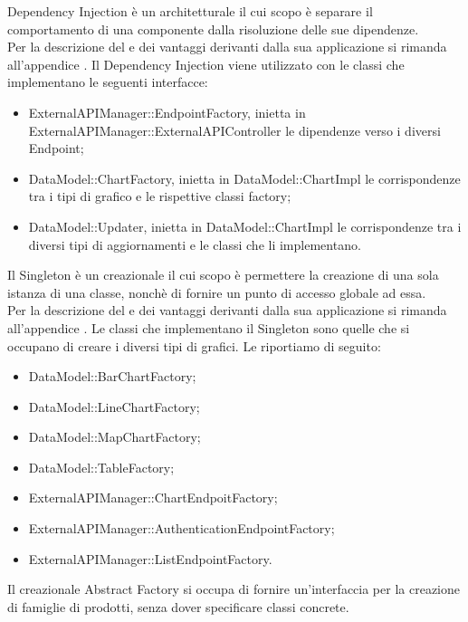 		Dependency Injection è un  architetturale il cui scopo è separare il comportamento di una componente dalla risoluzione delle sue dipendenze.\\
		Per la descrizione del  e dei vantaggi derivanti dalla sua applicazione si rimanda all'appendice .
			Il  Dependency Injection viene utilizzato con le classi che implementano le seguenti interfacce:
			\begin{itemize}
				\item ExternalAPIManager::EndpointFactory, inietta in ExternalAPIManager::ExternalAPIController le dipendenze verso i diversi Endpoint;
				\item DataModel::ChartFactory, inietta in DataModel::ChartImpl le  corrispondenze tra i tipi di grafico e le rispettive classi factory;
				\item DataModel::Updater, inietta in DataModel::ChartImpl le corrispondenze tra i diversi tipi di aggiornamenti e le classi che li implementano.
			\end{itemize}
			Il Singleton è un  creazionale il cui scopo è permettere la creazione di una sola istanza di una classe, nonchè di fornire un punto di accesso globale ad essa.\\
			Per la descrizione del  e dei vantaggi derivanti dalla sua applicazione si rimanda all'appendice .
				Le classi che implementano il Singleton sono quelle che si occupano di creare i diversi tipi di grafici. Le riportiamo di seguito:
				\begin{itemize}
					\item DataModel::BarChartFactory;
					\item DataModel::LineChartFactory;
					\item DataModel::MapChartFactory;
					\item DataModel::TableFactory;
					\item ExternalAPIManager::ChartEndpoitFactory;
					\item ExternalAPIManager::AuthenticationEndpointFactory;
					\item ExternalAPIManager::ListEndpointFactory.
				\end{itemize}
		Il  creazionale Abstract Factory si occupa di fornire un'interfaccia per la creazione di famiglie di prodotti, senza dover specificare classi concrete.\\
